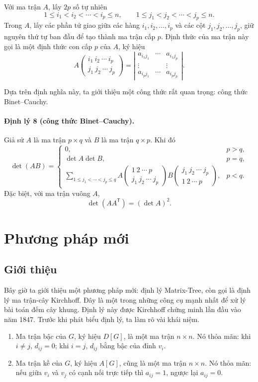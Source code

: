 \documentclass[11pt]{article}
\newcommand{\minor}[3]{#1\!\left(\begin{matrix}#2\\#3\end{matrix}\right)}
\begin{document}
Với ma trận \(A\), lấy \(2p\) số tự nhiên
\[
  1\le i_1<i_2<\cdots<i_p\le n,\qquad
  1\le j_1<j_2<\cdots<j_p\le n.
\]
Trong \(A\), lấy các phần tử giao giữa các hàng \(i_1,i_2,\ldots,i_p\) và các
cột \(j_1,j_2,\ldots,j_p\), giữ nguyên thứ tự ban đầu để tạo thành ma trận cấp
\(p\). Định thức của ma trận này gọi là một định thức con cấp \(p\) của \(A\),
ký hiệu
\[
  \minor{A}{i_1\ i_2\ \cdots\ i_p}{j_1\ j_2\ \cdots\ j_p}
  =
  \left|\begin{matrix}
  a_{i_1j_1}&\cdots&a_{i_1j_p}\\
  \vdots&&\vdots\\
  a_{i_pj_1}&\cdots&a_{i_pj_p}
  \end{matrix}\right|.
\]

Dựa trên định nghĩa này, ta giới thiệu một công thức rất quan trọng:
công thức Binet--Cauchy.

\paragraph{Định lý 8 (công thức Binet--Cauchy).}
Giả sử \(A\) là ma trận \(p\times q\) và \(B\) là ma trận \(q\times p\). Khi đó
\[
  \det(AB)=
  \begin{cases}
    0, & p>q,\\
    \det A\det B, & p=q,\\
    \displaystyle
    \sum_{1\le j_1<\cdots<j_p\le q}
    \minor{A}{1\ 2\ \cdots\ p}{j_1\ j_2\ \cdots\ j_p}
    \minor{B}{j_1\ j_2\ \cdots\ j_p}{1\ 2\ \cdots\ p},
    & p<q.
  \end{cases}
\]
Đặc biệt, với ma trận vuông \(A\),
\[
  \det(AA^{\mathsf T})=(\det A)^2.
\]

\section{Phương pháp mới}

\subsection{Giới thiệu}

Bây giờ ta giới thiệu một phương pháp mới: định lý Matrix-Tree, còn gọi là
định lý ma trận-cây Kirchhoff. Đây là một trong những công cụ mạnh nhất để xử
lý bài toán đếm cây khung. Định lý này được Kirchhoff chứng minh lần đầu vào
năm 1847. Trước khi phát biểu định lý, ta làm rõ vài khái niệm.

\begin{enumerate}
  \item Ma trận bậc của \(G\), ký hiệu \(D[G]\), là một ma trận \(n\times n\).
  Nó thỏa mãn: khi \(i\ne j\), \(d_{ij}=0\); khi \(i=j\), \(d_{ij}\) bằng bậc
  của đỉnh \(v_i\).

  \item Ma trận kề của \(G\), ký hiệu \(A[G]\), cũng là một ma trận
  \(n\times n\). Nó thỏa mãn: nếu giữa \(v_i\) và \(v_j\) có cạnh nối trực tiếp
  thì \(a_{ij}=1\), ngược lại \(a_{ij}=0\).
\end{enumerate}
\end{document}

